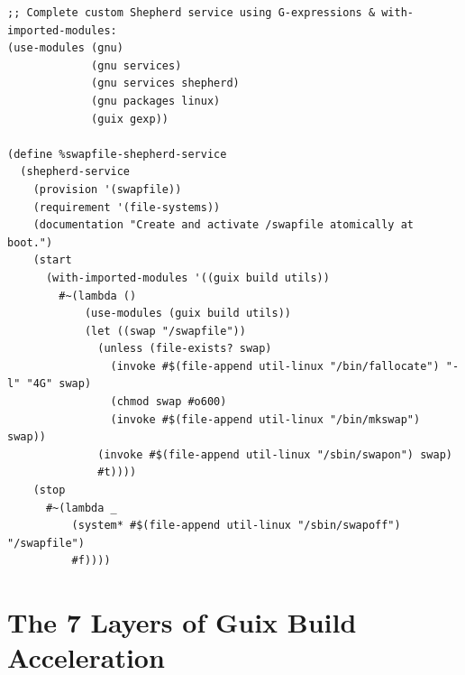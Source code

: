 \documentclass[11pt,oneside]{book}
\begin{document}
\begin{lstlisting}[language=GuileScheme]
;; Complete custom Shepherd service using G-expressions & with-imported-modules:
(use-modules (gnu)
             (gnu services)
             (gnu services shepherd)
             (gnu packages linux)
             (guix gexp))

(define %swapfile-shepherd-service
  (shepherd-service
    (provision '(swapfile))
    (requirement '(file-systems))
    (documentation "Create and activate /swapfile atomically at boot.")
    (start
      (with-imported-modules '((guix build utils))
        #~(lambda ()
            (use-modules (guix build utils))
            (let ((swap "/swapfile"))
              (unless (file-exists? swap)
                (invoke #$(file-append util-linux "/bin/fallocate") "-l" "4G" swap)
                (chmod swap #o600)
                (invoke #$(file-append util-linux "/bin/mkswap") swap))
              (invoke #$(file-append util-linux "/sbin/swapon") swap)
              #t))))
    (stop
      #~(lambda _
          (system* #$(file-append util-linux "/sbin/swapoff") "/swapfile")
          #f))))
\end{lstlisting}

\section{The 7 Layers of Guix Build Acceleration}
\end{document}

